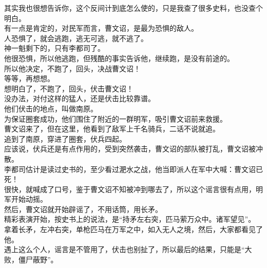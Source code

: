 \begin{multicols}{\theparacolNo}
其实我也很想告诉你，这个反间计到底怎么使的，只是我查了很多史料，也没查个明白。\\

有一点是肯定的，对民军而言，曹文诏，是最为恐惧的敌人。\\

人恐惧了，就会逃跑，逃无可逃，就不逃了。\\

神一魁剩下的，只有李都司了。\\

他很恐惧，所以他逃跑，但残酷的事实告诉他，继续跑，是没有前途的。\\

所以他决定，不跑了，回头，决战曹文诏！\\

等等，再想想。\\

想明白了，不跑了，回头，伏击曹文诏！\\

没办法，对付这样的猛人，还是伏击比较靠谱。\\

他们伏击的地点，叫做南原。\\

为保证圈套成功，他们围住了附近的一群明军，吸引曹文诏前来救援。\\

曹文诏来了，但在这里，他看到了敌军上千名骑兵，二话不说就追。\\

追到了南原，穿进了圈套，伏兵四起。\\

应该说，伏兵还是有点作用的，受到突然袭击，曹文诏的部队被打乱，曹文诏被冲散。\\

李都司估计是读过史书的，至少看过淝水之战，他当即派人在军中大喊：曹文诏已死！\\

很快，就喊成了口号，鉴于曹文诏不知被冲到哪去了，所以这个谣言很有点用，明军开始动摇。\\

然后，曹文诏就开始辟谣了，不用话筒，用长矛。\\

精彩表演开始，按史书上的说法，是“持矛左右突，匹马萦万众中。诸军望见”。\\

拿着长矛，左冲右突，单枪匹马在万军之中，如入无人之境，然后，大家都看见了他。\\

遇上这么个人，谣言是不管用了，伏击也别扯了，所以最后的结果，只能是“大败，僵尸蔽野”。\\


\end{multicols}

